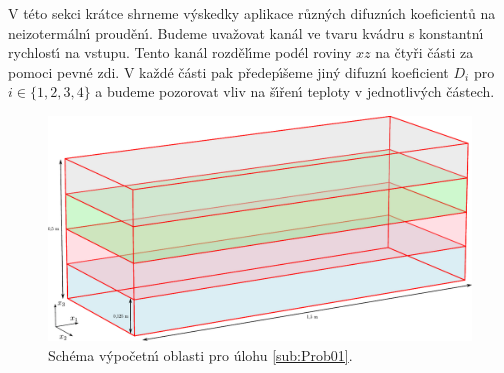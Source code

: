         V t\'{e}to sekci kr\'{a}tce shrneme v\'{y}skedky aplikace r\r{u}zn\'{y}ch difuzn\'{\i}ch koeficient\r{u} na neizoterm\'{a}ln\'{\i} proud\v{e}n\'{\i}. Budeme uva\v{z}ovat kan\'{a}l ve tvaru kv\'{a}dru s konstantn\'{\i} rychlost\'{\i} na vstupu. Tento kan\'{a}l rozd\v{e}l\'{\i}me pod\'{e}l roviny $xz$ na \v{c}ty\v{r}i \v{c}\'{a}sti za pomoci pevn\'{e} zdi. V ka\v{z}d\'{e} \v{c}\'{a}sti pak p\v{r}edep\'{\i}\v{s}eme jin\'{y} difuzn\'{\i} koeficient $D_i$ pro $i \in \{1,2,3,4 \}$ a budeme pozorovat vliv na \v{s}\'{\i}\v{r}en\'{\i} teploty v jednotliv\'{y}ch \v{c}\'{a}stech. 

        \begin{figure}[H]
            \centering
            \includegraphics[width=.9\linewidth]{Img/Kapitola4/dif_dom.pdf}
            \caption{Sch\'{e}ma v\'{y}po\v{c}etn\'{\i} oblasti pro \'{u}lohu \ref{sub:Prob01}.}
            \label{fig:Probl01_domain}
        \end{figure}


